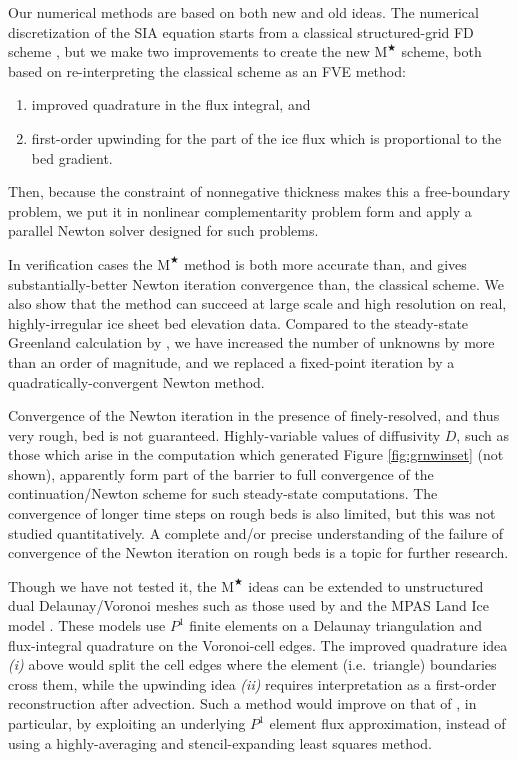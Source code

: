 \documentclass[review,letterpaper]{igs}
\newcommand{\Mstar}{$\text{M}^{\bigstar}$\xspace}
\begin{document}
Our numerical methods are based on both new and old ideas.  The numerical discretization of the SIA equation starts from a classical structured-grid FD scheme \citep{Mahaffy1976}, but we make two improvements to create the new \Mstar scheme, both based on re-interpreting the classical scheme as an FVE method:
\renewcommand{\labelenumi}{\emph{(\roman{enumi})}}
\begin{enumerate}
\item improved quadrature in the flux integral, and
\item first-order upwinding for the part of the ice flux which is proportional to the bed gradient.
\end{enumerate}
Then, because the constraint of nonnegative thickness makes this a free-boundary problem, we put it in nonlinear complementarity problem form and apply a parallel Newton solver designed for such problems.

In verification cases the \Mstar method is both more accurate than, and gives substantially-better Newton iteration convergence than, the classical scheme.  We also show that the method can succeed at large scale and high resolution on real, highly-irregular ice sheet bed elevation data.  Compared to the steady-state Greenland calculation by \cite{JouvetBueler2012}, we have increased the number of unknowns by more than an order of magnitude, and we replaced a fixed-point iteration by a quadratically-convergent Newton method.

Convergence of the Newton iteration in the presence of finely-resolved, and thus very rough, bed is not guaranteed.  Highly-variable values of diffusivity $D$, such as those which arise in the computation which generated Figure \ref{fig:grnwinset} (not shown), apparently form part of the barrier to full convergence of the continuation/Newton scheme for such steady-state computations.  The convergence of longer time steps on rough beds is also limited, but this was not studied quantitatively.  A complete and/or precise understanding of the failure of convergence of the Newton iteration on rough beds is a topic for further research.

Though we have not tested it, the \Mstar ideas can be extended to unstructured dual Delaunay/Voronoi meshes such as those used by \cite{EgholmNielsen2010} and the MPAS Land Ice model \citep{MPASLandIce2013,Ringleretal2013}.  These models use $P^1$ finite elements on a Delaunay triangulation and flux-integral quadrature on the Voronoi-cell edges.  The improved quadrature idea \emph{(i)} above would split the cell edges where the element (i.e.~triangle) boundaries cross them, while the upwinding idea \emph{(ii)} requires interpretation as a first-order reconstruction after advection.  Such a method would improve on that of \cite{EgholmNielsen2010}, in particular, by exploiting an underlying $P^1$ element flux approximation, instead of using a highly-averaging and stencil-expanding least squares method.
\end{document}
